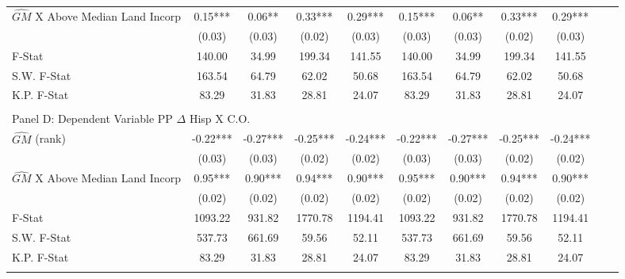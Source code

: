 \begin{table}[htbp]
\begin{threeparttable}
\begin{tabular}{l*{10}{c}}
\addlinespace
$\hat{GM}$ X Above Median Land Incorp&       0.15***&       0.06** &       0.33***&       0.29***&       0.15***&       0.06** &       0.33***&       0.29***\\
                &     (0.03)   &     (0.03)   &     (0.02)   &     (0.03)   &     (0.03)   &     (0.03)   &     (0.02)   &     (0.03)   \\
\midrule
F-Stat          &     140.00   &      34.99   &     199.34   &     141.55   &     140.00   &      34.99   &     199.34   &     141.55   \\
S.W. F-Stat     &     163.54   &      64.79   &      62.02   &      50.68   &     163.54   &      64.79   &      62.02   &      50.68   \\
K.P. F-Stat     &      83.29   &      31.83   &      28.81   &      24.07   &      83.29   &      31.83   &      28.81   &      24.07   \\
\cmidrule[\heavyrulewidth](lr){1-9} \\ \cmidrule[\heavyrulewidth](lr){1-9}
\multicolumn{8}{l}{Panel D: Dependent Variable PP $\Delta$ Hisp X C.O.}\\
\cmidrule(lr){1-9}
$\hat{GM}$ (rank)&      -0.22***&      -0.27***&      -0.25***&      -0.24***&      -0.22***&      -0.27***&      -0.25***&      -0.24***\\
                &     (0.03)   &     (0.03)   &     (0.02)   &     (0.02)   &     (0.03)   &     (0.03)   &     (0.02)   &     (0.02)   \\
\addlinespace
$\hat{GM}$ X Above Median Land Incorp&       0.95***&       0.90***&       0.94***&       0.90***&       0.95***&       0.90***&       0.94***&       0.90***\\
                &     (0.02)   &     (0.02)   &     (0.02)   &     (0.02)   &     (0.02)   &     (0.02)   &     (0.02)   &     (0.02)   \\
\midrule
F-Stat          &    1093.22   &     931.82   &    1770.78   &    1194.41   &    1093.22   &     931.82   &    1770.78   &    1194.41   \\
S.W. F-Stat     &     537.73   &     661.69   &      59.56   &      52.11   &     537.73   &     661.69   &      59.56   &      52.11   \\
K.P. F-Stat     &      83.29   &      31.83   &      28.81   &      24.07   &      83.29   &      31.83   &      28.81   &      24.07   \\
\cmidrule[\heavyrulewidth](lr){1-9} \\ \cmidrule[\heavyrulewidth](lr){1-9}

\end{tabular}
\end{threeparttable}
\end{table}
